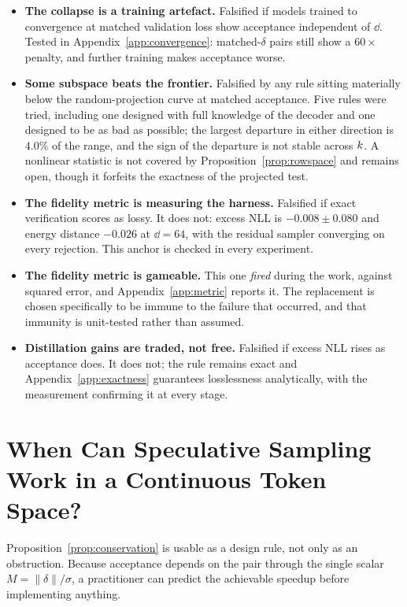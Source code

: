 \begin{itemize}
\itemsep2pt
\item \textbf{The collapse is a training artefact.} Falsified if models trained to convergence at
matched validation loss show acceptance independent of $\dd$. Tested in
Appendix~\ref{app:convergence}: matched-$\delta$ pairs still show a $60\times$ penalty, and further
training makes acceptance worse.

\item \textbf{Some subspace beats the frontier.} Falsified by any rule sitting materially below the
random-projection curve at matched acceptance. Five rules were tried, including one designed with full
knowledge of the decoder and one designed to be as bad as possible; the largest departure in either
direction is $4.0\%$ of the range, and the sign of the departure is not stable across $k$. A
nonlinear statistic is not covered by Proposition~\ref{prop:rowspace} and remains open, though it
forfeits the exactness of the projected test.

\item \textbf{The fidelity metric is measuring the harness.} Falsified if exact verification scores as
lossy. It does not: excess NLL is $-0.008 \pm 0.080$ and energy distance $-0.026$ at $\dd{=}64$, with
the residual sampler converging on every rejection. This anchor is checked in every experiment.

\item \textbf{The fidelity metric is gameable.} This one \emph{fired} during the work, against squared
error, and Appendix~\ref{app:metric} reports it. The replacement is chosen specifically to be immune
to the failure that occurred, and that immunity is unit-tested rather than assumed.

\item \textbf{Distillation gains are traded, not free.} Falsified if excess NLL rises as acceptance
does. It does not; the rule remains exact and Appendix~\ref{app:exactness} guarantees losslessness
analytically, with the measurement confirming it at every stage.
\end{itemize}

\section{When Can Speculative Sampling Work in a Continuous Token Space?}
\label{app:practical}

Proposition~\ref{prop:conservation} is usable as a design rule, not only as an obstruction. Because
acceptance depends on the pair through the single scalar $M = \|\delta\|/\sigma$, a practitioner can
predict the achievable speedup before implementing anything.

